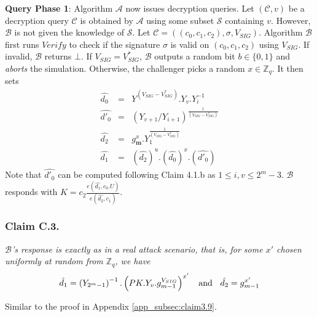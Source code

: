 \noindent\textbf{Query Phase 1}: Algorithm $\mathcal{A}$ now issues decryption queries. Let $(\mathcal{C},v)$ be a decryption query $\mathcal{C}$ is obtained by $\mathcal{A}$ using some subset $\mathcal{S}$ containing $v$. However, $\mathcal{B}$ is not given the knowledge of $\mathcal{S}$. Let $\mathcal{C}=((c_0,c_1,c_2),\sigma,V_{SIG})$. Algorithm $\mathcal{B}$ first runs $Verify$ to check if the signature $\sigma$ is valid on $(c_0,c_1,c_2)$ using $V_{SIG}$. If invalid, $\mathcal{B}$ returns $\bot$. If $V_{SIG} = V^{*}_{SIG}$, $\mathcal{B}$ outputs a random bit $b\in\{0,1\}$ and \emph{aborts} the simulation. Otherwise, the challenger picks a random $x\in\mathbb{Z}_q$. It then sets
\begin{eqnarray}
 \hat{d_0}&=&Y^{(V_{SIG}-V^{*}_{SIG})}.Y_v.Y^{-1}_i\nonumber\\
 \hat{d'_0}&=&(Y_{v+1}/Y_{i+1})^{\frac{1}{(V_{SIG}-V^{*}_{SIG})}}\nonumber \\
 \hat{d_2}&=&g^{x}_{\mathbf{m}}.Y^{\frac{1}{(V_{SIG}-V^{*}_{SIG})}}_1\nonumber\\
 \hat{d_1}&=&\left(\hat{d_2}\right)^u.\left(\hat{d_0}\right)^x.\left(\hat{d'_0}\right) \nonumber 
\end{eqnarray}
\noindent Note that $\hat{d'_0}$ can be computed following Claim 4.1.b as $1\leq i,v \leq 2^m-3$. $\mathcal{B}$ responds with $K=c_2\frac{{e}(\hat{d_1},c_0.U)}{{e}(\hat{d_2},c_1)}$. 

\subsubsection{Claim C.3.} \textit{$\mathcal{B}$'s response is exactly as in a real attack scenario, that is, for some $x'$ chosen uniformly at random from $\mathbb{Z}_q$, we have} 
\begin{equation}
\hat{d_1} = \left({Y_{2^m-1}}\right)^{-1}.\left(PK.Y_v.g^{V_{SIG}}_{m-1}\right)^{x'}\hspace{2mm} \text{ and }\hspace{2mm} \hat{d_2} = g^{x'}_{m-1}\nonumber
\end{equation}

 Similar to the proof in Appendix \ref{app_subsec:claim3.9}.\\

% 
% 

